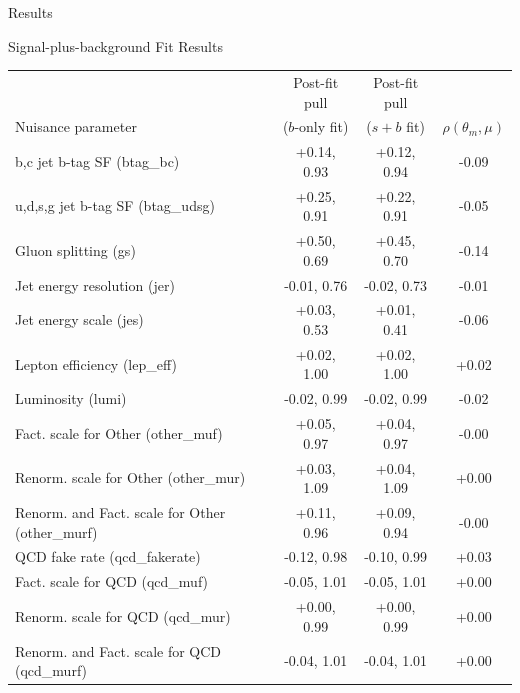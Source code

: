 \begin{section}{Results}
\begin{subsection}{Signal-plus-background Fit Results}
\begin{table}[tbp!]
\begin{center}
\begin{tabular}{|l|c|c|c|} \hline
                                                  &  Post-fit pull   &  Post-fit pull  &                         \\
Nuisance parameter                                &  ($b$-only fit)  &  ($s+b$ fit)    & $\rho(\theta_{m}, \mu)$ \\  
\hline
b,c jet b-tag SF (btag\_bc)                       &  +0.14, 0.93     &  +0.12, 0.94    &  -0.09                  \\
u,d,s,g jet b-tag SF (btag\_udsg)                 &  +0.25, 0.91     &  +0.22, 0.91    &  -0.05                  \\
Gluon splitting (gs)                              &  +0.50, 0.69     &  +0.45, 0.70    &  -0.14                  \\
Jet energy resolution (jer)                       &  -0.01, 0.76     &  -0.02, 0.73    &  -0.01                  \\
Jet energy scale (jes)                            &  +0.03, 0.53     &  +0.01, 0.41    &  -0.06                  \\
Lepton efficiency (lep\_eff)                      &  +0.02, 1.00     &  +0.02, 1.00    &  +0.02                  \\
Luminosity (lumi)                                 &  -0.02, 0.99     &  -0.02, 0.99    &  -0.02                  \\
Fact. scale for Other (other\_muf)                &  +0.05, 0.97     &  +0.04, 0.97    &  -0.00                  \\
Renorm. scale for Other (other\_mur)              &  +0.03, 1.09     &  +0.04, 1.09    &  +0.00                  \\
Renorm. and Fact. scale for Other (other\_murf)   &  +0.11, 0.96     &  +0.09, 0.94    &  -0.00                  \\
QCD fake rate (qcd\_fakerate)                     &  -0.12, 0.98     &  -0.10, 0.99    &  +0.03                  \\
Fact. scale for QCD (qcd\_muf)                    &  -0.05, 1.01     &  -0.05, 1.01    &  +0.00                  \\
Renorm. scale for QCD (qcd\_mur)                  &  +0.00, 0.99     &  +0.00, 0.99    &  +0.00                  \\
Renorm. and Fact. scale for QCD (qcd\_murf)       &  -0.04, 1.01     &  -0.04, 1.01    &  +0.00                  \\

\end{tabular}
\end{center}
\end{table}
\end{subsection}
\end{section}
